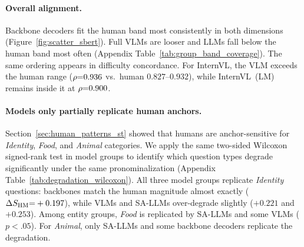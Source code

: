 \documentclass[letterpaper]{article}
\begin{document}
\paragraph{Overall alignment.}
Backbone decoders fit the human band most consistently in both dimensions (Figure~\ref{fig:scatter_sbert}). %
Full VLMs are looser and LLMs fall below the human band most often (Appendix Table~\ref{tab:group_band_coverage}). %
The same ordering appears in difficulty concordance. For InternVL, the VLM exceeds the human range ($\rho{=}0.936$ vs.\ human $0.827$--$0.932$), while InternVL~(LM) remains inside it at $\rho{=}0.900$.

\paragraph{Models only partially replicate human anchors.}
Section~\ref{sec:human_patterns_st} showed that humans are anchor-sensitive for \textit{Identity}, \textit{Food}, and \textit{Animal} categories. %
We apply the same two-sided Wilcoxon signed-rank test in model groups to identify which question types degrade significantly under the same pronominalization (Appendix Table~\ref{tab:degradation_wilcoxon}). 
All three model groups replicate \textit{Identity} questions: backbones match the human magnitude almost exactly ($\Delta\sHM{=}+0.197$), while VLMs and SA-LLMs over-degrade slightly ($+0.221$ and $+0.253$).
Among entity groups, \textit{Food} is replicated by SA-LLMs and some VLMs ($p{<}.05$). %
For \textit{Animal}, only SA-LLMs and some backbone decoders replicate the degradation.
\end{document}
